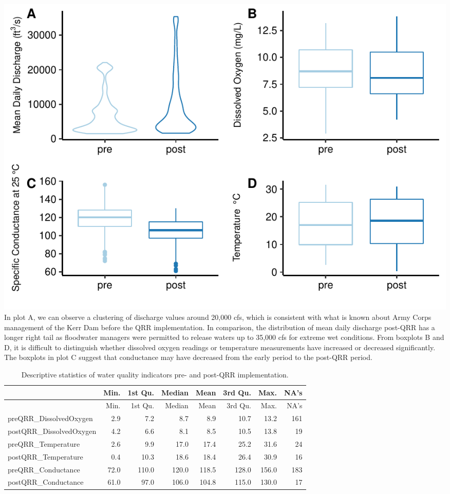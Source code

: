 \documentclass[12pt,]{article}
\begin{document}
\includegraphics{Project_Template_files/figure-latex/unnamed-chunk-4-1.pdf}
In plot A, we can observe a clustering of discharge values around 20,000
cfs, which is consistent with what is known about Army Corps management
of the Kerr Dam before the QRR implementation. In comparison, the
distribution of mean daily discharge post-QRR has a longer right tail as
floodwater managers were permitted to release waters up to 35,000 cfs
for extreme wet conditions. From boxplots B and D, it is difficult to
distinguish whether dissolved oxygen readings or temperature
measurements have increased or decreased significantly. The boxplots in
plot C suggest that conductance may have decreased from the early period
to the post-QRR period.

\begin{longtable}[]{@{}lrrrrrrr@{}}
\caption{Descriptive statistics of water quality indicators pre- and
post-QRR implementation.}\tabularnewline
\toprule
& Min. & 1st Qu. & Median & Mean & 3rd Qu. & Max. & NA's\tabularnewline
\midrule
\endfirsthead
\toprule
& Min. & 1st Qu. & Median & Mean & 3rd Qu. & Max. & NA's\tabularnewline
\midrule
\endhead
preQRR\_DissolvedOxygen & 2.9 & 7.2 & 8.7 & 8.9 & 10.7 & 13.2 &
161\tabularnewline
postQRR\_DissolvedOxygen & 4.2 & 6.6 & 8.1 & 8.5 & 10.5 & 13.8 &
19\tabularnewline
preQRR\_Temperature & 2.6 & 9.9 & 17.0 & 17.4 & 25.2 & 31.6 &
24\tabularnewline
postQRR\_Temperature & 0.4 & 10.3 & 18.6 & 18.4 & 26.4 & 30.9 &
16\tabularnewline
preQRR\_Conductance & 72.0 & 110.0 & 120.0 & 118.5 & 128.0 & 156.0 &
183\tabularnewline
postQRR\_Conductance & 61.0 & 97.0 & 106.0 & 104.8 & 115.0 & 130.0 &
17\tabularnewline
\bottomrule
\end{longtable}
\end{document}
